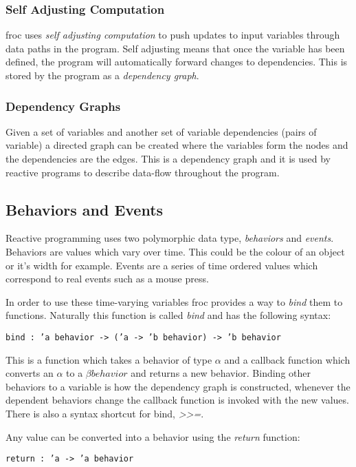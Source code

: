 \subsubsection{Self Adjusting Computation}
froc uses \emph{self adjusting computation} to push updates to input variables through data paths in the program. Self adjusting means that once the variable has been defined, the program will automatically forward changes to dependencies. This is stored by the program as a \emph{dependency graph}.

\subsubsection{Dependency Graphs}
Given a set of variables and another set of variable dependencies (pairs of variable) a directed graph can be created where the variables form the nodes and the dependencies are the edges. This is a dependency graph and it is used by reactive programs to describe data-flow throughout the program.

\subsection{Behaviors and Events}

Reactive programming uses two polymorphic data type, \emph{behaviors} and \emph{events}. Behaviors are values which vary over time. This could be the colour of an object or it's width for example. Events are a series of time ordered values which correspond to real events such as a mouse press.\cite{bib:lambda}

In order to use these time-varying variables froc provides a way to \emph{bind} them to functions. Naturally this function is called \emph{bind} and has the following syntax:

\texttt{bind : 'a behavior -> ('a -> 'b behavior) -> 'b behavior}

This is a function which takes a behavior of type $\alpha$ and a callback function which converts an $\alpha$ to a $\beta behavior$ and returns a new behavior. Binding other behaviors to a variable is how the dependency graph is constructed, whenever the dependent behaviors change the callback function is invoked with the new values. There is also a syntax shortcut for bind, \emph{\textgreater\textgreater=}.

Any value can be converted into a behavior using the \emph{return} function:

\texttt{return : 'a -> 'a behavior}

